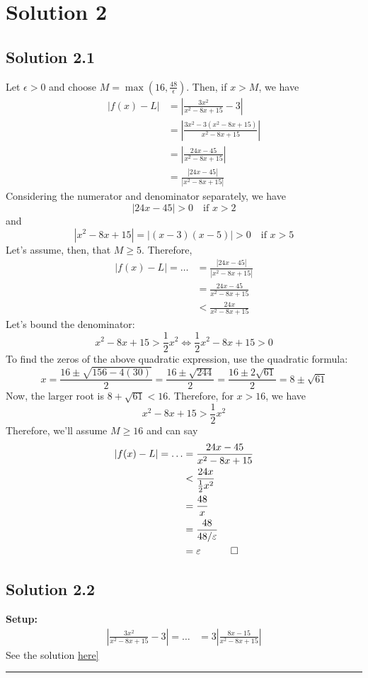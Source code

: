 \documentclass{article}
\begin{document}
\section*{Solution 2}
\subsection*{Solution 2.1}
Let $\epsilon > 0$ and choose $M = \max\left(16,\frac{48}{\epsilon}\right)$. Then, if $x > M$, we have 
\begin{align*}
    \left| f(x) - L \right|
    &=\left| \frac{3x^2}{x^2-8x+15} - 3 \right| \\
    &= \left| \frac{3x^2 - 3(x^2-8x+15)}{x^2-8x+15} \right| \\
    &= \left| \frac{24x - 45}{x^2-8x+15} \right| \\
    &= \frac{ \left|24x-45\right| }{ \left|x^2-8x+15\right| }
\end{align*}
Considering the numerator and denominator separately, we have
\[
    \left|24x-45\right| > 0 \quad \text{if }x > 2
\]
and
\[
    \left|x^2-8x+15\right| = \left|(x-3)(x-5)\right| > 0\quad \text{if } x > 5
\]
Let's assume, then, that $M \geq 5$. Therefore,
\begin{align*}
    \left|f(x)-L\right| = \ldots &= \frac{ \left|24x-45\right| }{ \left|x^2-8x+15\right| } \\
    &= \frac{24x-45}{x^2-8x+15} \\
    &< \frac{24x}{x^2-8x+15}
\end{align*}
Let's bound the denominator:
\[
    x^2-8x+15 > \frac{1}{2}x^2 \iff \frac{1}{2}x^2 - 8x + 15 > 0
\]
To find the zeros of the above quadratic expression, use the quadratic formula:
\[
    x = \frac{16 \pm \sqrt{156 - 4(30)}}{2} = \frac{16\pm \sqrt{244}}{2} = \frac{16 \pm 2\sqrt{61}}{2} = 8\pm \sqrt{61}
\]
Now, the larger root is $8 + \sqrt{61} < 16$. Therefore, for $x > 16$, we have
\[
    x^2-8x+15 > \frac{1}{2}x^2
\]
Therefore, we'll assume $M \geq 16$ and can say
\begin{align*}
    \left|f(x)-L\right| = \ldots &= \frac{24x-45}{x^2-8x+15} \\
    &< \frac{24x}{\frac{1}{2}x^2} \\ 
    &= \frac{48}{x} \\
    &= \frac{48}{48/\epsilon} \\
    &= \epsilon \quad \qed
\end{align*}
\subsection*{Solution 2.2}
\textbf{Setup: } 
\begin{align*}
    \left|\frac{3x^2}{x^2-8x+15} - 3 \right| = \ldots &=3\left|\frac{8x-15}{x^2-8x+15} \right|
\end{align*}
See the solution \href{https://drive.google.com/file/d/1Jr-4IQba3sL3lEX3WXa2Sx_bBObRx9gC/view?usp=drive_link}{here]}

\begin{center} \rule{15cm}{1mm} \end{center}
\end{document}
